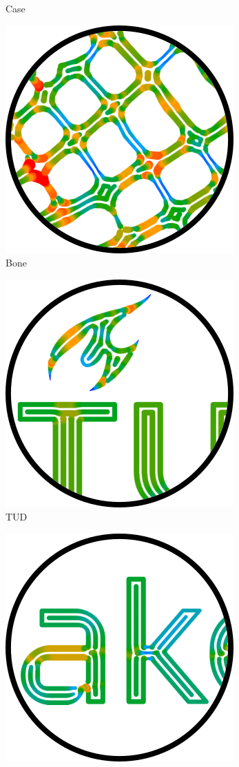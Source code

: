 \begin{figure}
\begin{subfigure}{\figwidth}
\caption{Case}%
\end{subfigure}
\begin{subfigure}{\figwidth}\centering
\includegraphics[height=\figheight]{sources/applications/topopt_bone.png}
\caption{Bone}%
\end{subfigure}
\begin{subfigure}{\figwidth}\centering
\includegraphics[height=\figheight]{sources/applications/tud_logo.png}
\caption{TUD}%
\end{subfigure}
\begin{subfigure}{\figwidth}\centering
\includegraphics[height=\figheight]{sources/applications/ultimaker_logo.png}

\end{subfigure}
\end{figure}
